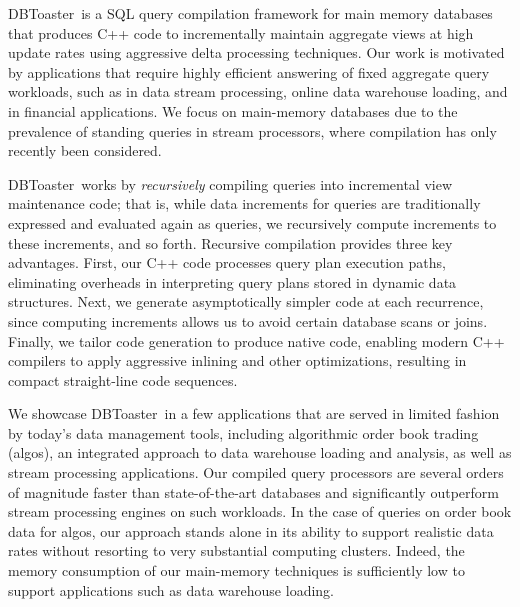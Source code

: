 \documentclass{vldb}
\newcommand{\comment}[1]{}
\newcommand{\compiler}{DBToaster}
\begin{document}
\compiler\ is a SQL query compilation framework for main memory databases that
produces C++ code to incrementally maintain aggregate views at high update rates
using aggressive delta processing techniques. Our work is motivated by
applications that require highly efficient answering of fixed aggregate query
workloads, such as in data stream processing, online data warehouse loading, and
in financial applications. We focus on main-memory databases due to the
prevalence of standing queries in stream processors, where compilation has
only recently been considered.

\compiler\ works by {\em recursively}\/ compiling queries into incremental view
maintenance code; that is, while data increments for queries are traditionally
expressed and evaluated again as queries, we recursively compute increments to
these increments, and so forth. Recursive compilation provides three key
advantages. First, our C++ code processes query plan execution paths, eliminating
overheads in interpreting query plans stored in dynamic data structures. Next, we
generate asymptotically simpler code at each recurrence, since computing
increments allows us to avoid certain database scans or joins. Finally, we tailor
code generation to produce native code, enabling modern C++ compilers to apply
aggressive inlining and other optimizations, resulting in compact straight-line
code sequences.

\comment{
This often allows us to completely eliminate
all queries, where each compilation step yields code that is substantially
simpler than the query processing techniques in previous incremental view
maintenance approaches.
}

We showcase \compiler\ in a few applications that are served in limited fashion
by today's data management tools, including algorithmic order book trading
(algos), an integrated approach to data warehouse loading and analysis, as well
as stream processing applications. Our compiled query processors are several
orders of magnitude faster than state-of-the-art databases and significantly
outperform stream processing engines on such workloads. In the case of queries on
order book data for algos, our approach stands alone in its ability to support
realistic  data rates  without resorting to very substantial computing clusters.
Indeed, the memory consumption of our main-memory techniques is sufficiently low
to support applications such as data warehouse loading.
\end{document}
